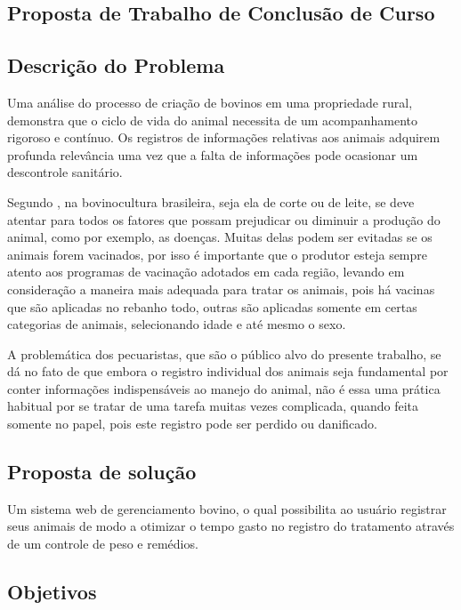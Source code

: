 \documentclass[12pt]{article}
\begin{document}
\begin{titlepage}
	\begin{center}

\section{Proposta de Trabalho de Conclusão de Curso}

\subsection{Descrição do Problema}
Uma análise do processo de criação de bovinos em uma propriedade rural, demonstra que o ciclo de vida do animal necessita de um acompanhamento rigoroso e contínuo. Os registros de informações relativas aos animais adquirem profunda relevância uma vez que a falta de informações pode ocasionar um descontrole sanitário.

Segundo , na bovinocultura brasileira, seja ela de corte ou de leite, se deve atentar para todos os fatores que possam prejudicar ou diminuir a produção do animal, como por exemplo, as doenças. Muitas  delas podem ser evitadas se os animais forem vacinados, por isso é importante que o produtor esteja sempre atento aos programas de vacinação adotados em cada região, levando em consideração a maneira mais adequada para tratar os animais, pois há vacinas que são aplicadas no rebanho todo, outras são aplicadas somente em certas categorias de animais, selecionando idade e até mesmo o sexo.

A problemática dos pecuaristas, que são o público alvo do presente trabalho, se dá no fato de que embora o registro individual dos animais seja fundamental por conter informações indispensáveis ao manejo do animal, não é essa uma prática habitual por se tratar de uma tarefa muitas vezes complicada, quando feita somente no papel, pois este registro pode ser perdido ou danificado.

\subsection{Proposta de solução}

Um sistema web de gerenciamento bovino, o qual possibilita ao usuário registrar seus animais de modo a otimizar o tempo gasto no registro do tratamento através de um controle de peso e remédios.

\subsection{Objetivos}


\end{center}
\end{titlepage}
\end{document}

